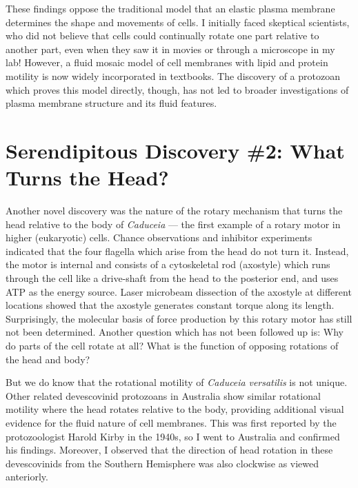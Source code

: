 \documentclass[authordate, editorial]{jote-new-article}
\begin{document}
	These findings oppose the traditional model that an elastic plasma membrane determines the shape and movements of cells. I initially faced skeptical scientists, who did not believe that cells could continually rotate one part relative to another part, even when they saw it in movies or through a microscope in my lab! However, a fluid mosaic model of cell membranes with lipid and protein motility is now widely incorporated in textbooks. The discovery of a protozoan which proves this model directly, though, has not led to broader investigations of plasma membrane structure and its fluid features.







	\section{Serendipitous Discovery \#2: What Turns the Head? }







	Another novel discovery was the nature of the rotary mechanism that turns the head relative to the body of \emph{Caduceia} — the first example of a rotary motor in higher (eukaryotic) cells. Chance observations and inhibitor experiments indicated that the four flagella which arise from the head do not turn it. Instead, the motor is internal and consists of a cytoskeletal rod (axostyle) which runs through the cell like a drive-shaft from the head to the posterior end, and uses ATP as the energy source. Laser microbeam dissection of the axostyle at different locations showed that the axostyle generates constant torque along its length. Surprisingly, the molecular basis of force production by this rotary motor has still not been determined. Another question which has not been followed up is: Why do parts of the cell rotate at all? What is the function of opposing rotations of the head and body?
	







	But we do know that the rotational motility of \emph{Caduceia}\emph{ }\emph{versatilis} is not unique. Other related devescovinid protozoans in Australia show similar rotational motility where the head rotates relative to the body, providing additional visual evidence for the fluid nature of cell membranes. This was first reported by the protozoologist Harold Kirby in the 1940s, so I went to Australia and confirmed his findings. Moreover, I observed that the direction of head rotation in these devescovinids from the Southern Hemisphere was also clockwise as viewed anteriorly.
\end{document}
